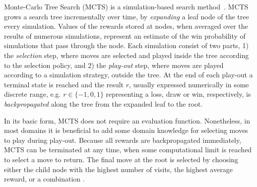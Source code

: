 \documentclass{ecai2014}
\begin{document}
Monte-Carlo Tree Search (MCTS) is a simulation-based search method~\cite{coulom2007efficient,kocsis2006bandit}. MCTS grows a search tree incrementally over time, by \emph{expanding} a leaf node of the tree every simulation. Values of the rewards stored at nodes, when averaged over the results of numerous simulations, represent an estimate of the win probability of simulations that pass through the node. 
Each simulation consist of two parts, 1) the \emph{selection} step, where moves are selected and played inside the tree according to the selection policy, and 2) the \emph{play-out} step, where moves are played according to a simulation strategy, outside the tree. At the end of each play-out a terminal state is reached and the result $r$, usually expressed numerically in some discrete range, e.g. $r \in \{-1, 0, 1\}$ representing a loss, draw or win, respectively, is \emph{backpropagated} along the tree from the expanded leaf to the root. 

In its basic form, MCTS does not require an evaluation function. Nonetheless, in most domains it is beneficial to add some domain knowledge for selecting moves to play during play-out. Because all rewards are backpropagated immediately, MCTS can be terminated at any time, when some computational limit is reached to select a move to return. The final move at the root is selected by choosing either the child node with the highest number of visits, the highest average reward, or a combination \cite{chaslot2008progressive}. 

\end{document}
